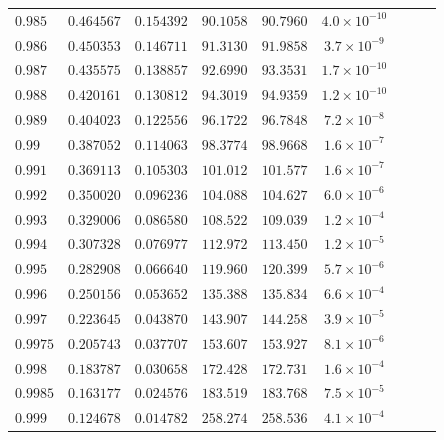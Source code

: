 \documentclass[12pt]{extarticle}
\theoremstyle{plain}
\theoremstyle{remark}
\begin{document}
\begin{longtable}{lcccccccc}
$0.985$ & $0.464567$ & $0.154392$ & $90.1058$ & $90.7960$ & $4.0\times10^{-10}$ \\
$0.986$ & $0.450353$ & $0.146711$ & $91.3130$ & $91.9858$ & $3.7\times10^{-9}$ \\
$0.987$ & $0.435575$ & $0.138857$ & $92.6990$ & $93.3531$ & $1.7\times10^{-10}$ \\
$0.988$ & $0.420161$ & $0.130812$ & $94.3019$ & $94.9359$ & $1.2\times10^{-10}$ \\
$0.989$ & $0.404023$ & $0.122556$ & $96.1722$ & $96.7848$ & $7.2\times10^{-8}$ \\
$0.99$ & $0.387052$ & $0.114063$ & $98.3774$ & $98.9668$ & $1.6\times10^{-7}$ \\
$0.991$ & $0.369113$ & $0.105303$ & $101.012$ & $101.577$ & $1.6\times10^{-7}$ \\
$0.992$ & $0.350020$ & $0.096236$ & $104.088$ & $104.627$ & $6.0\times10^{-6}$ \\
$0.993$ & $0.329006$ & $0.086580$ & $108.522$ & $109.039$ & $1.2\times10^{-4}$ \\
$0.994$ & $0.307328$ & $0.076977$ & $112.972$ & $113.450$ & $1.2\times10^{-5}$ \\
$0.995$ & $0.282908$ & $0.066640$ & $119.960$ & $120.399$ & $5.7\times10^{-6}$ \\
$0.996$ & $0.250156$ & $0.053652$ & $135.388$ & $135.834$ & $6.6\times10^{-4}$ \\
$0.997$ & $0.223645$ & $0.043870$ & $143.907$ & $144.258$ & $3.9\times10^{-5}$ \\
$0.9975$ & $0.205743$ & $0.037707$ & $153.607$ & $153.927$ & $8.1\times10^{-6}$ \\
$0.998$ & $0.183787$ & $0.030658$ & $172.428$ & $172.731$ & $1.6\times10^{-4}$ \\
$0.9985$ & $0.163177$ & $0.024576$ & $183.519$ & $183.768$ & $7.5\times10^{-5}$ \\
$0.999$ & $0.124678$ & $0.014782$ & $258.274$ & $258.536$ & $4.1\times10^{-4}$ \\
\end{longtable}
\end{document}
